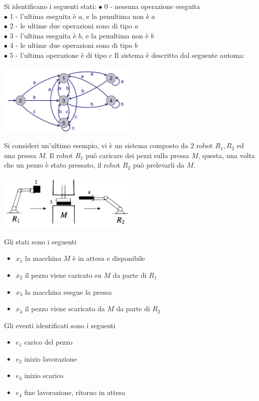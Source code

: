 \documentclass[10pt, letterpaper]{report}
\begin{document}
Si identificano i seguenti stati:\acc 
$\bullet$ 0 - nessuna operazione eseguita\\ 
$\bullet$ 1 - l'ultima eseguita è $a$, e la penultima non è $a$\\
$\bullet$ 2 - le ultime due operazioni sono di tipo $a$\\
$\bullet$ 3 - l'ultima eseguita è $b$, e la penultima non è $b$\\
$\bullet$ 4 - le ultime due operazioni sono di tipo $b$\\
$\bullet$ 5 - l'ultima operazione è di tipo $c$\acc 
Il sistema è descritto dal seguente automa:\begin{center}
    \includegraphics[width=0.5\textwidth]{images/automa2.png}
\end{center}
Si consideri un'ultimo esempio, vi è un sistema composto da 2 robot $R_1,R_2$ ed una pressa $M$. Il robot $R_1$ può caricare dei pezzi sulla pressa $M$, questa, una volta che un pezzo è stato pressato, il robot $R_2$ può prelevarli da $M$.\begin{center}
    \includegraphics[width=0.5\textwidth]{images/robotPressa.pdf}
\end{center}
Gli stati sono i seguenti\begin{itemize}
    \item $x_1$ la macchina $M$ è in attesa e disponibile 
    \item $x_2$ il pezzo viene caricato su $M$ da parte di $R_1$
    \item $x_3$ la macchina esegue la pressa 
    \item $x_4$ il pezzo viene scaricato da $M$ da parte di $R_2$
\end{itemize}
Gli eventi identificati sono i seguenti \begin{itemize}
    \item $e_1$ carico del pezzo 
    \item $e_2$ inizio lavorazione 
    \item $e_3$ inizio scarico 
    \item $e_4$ fine lavorazione, ritorno in attesa 
\end{itemize}
\end{document}

